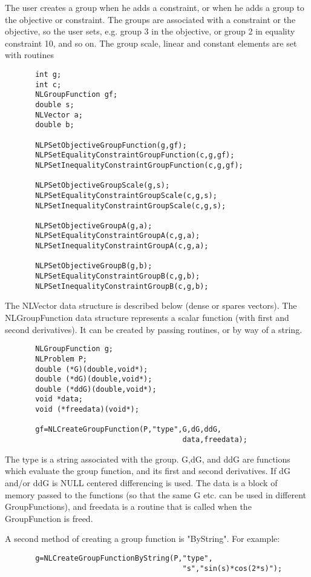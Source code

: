 \documentclass[12pt]{article}
\begin{document}
     The user creates a group when he adds a constraint, or when he adds a group to the objective or constraint.
     The groups are associated with a constraint or the objective, so the user sets, e.g. group 3 in the objective,
     or group 2 in equality constraint 10, and so on. The group scale, linear and constant elements are set with routines 
     \begin{verbatim}
       int g;
       int c;
       NLGroupFunction gf;
       double s;
       NLVector a;
       double b;

       NLPSetObjectiveGroupFunction(g,gf);
       NLPSetEqualityConstraintGroupFunction(c,g,gf);
       NLPSetInequalityConstraintGroupFunction(c,g,gf);

       NLPSetObjectiveGroupScale(g,s);
       NLPSetEqualityConstraintGroupScale(c,g,s);
       NLPSetInequalityConstraintGroupScale(c,g,s);

       NLPSetObjectiveGroupA(g,a);
       NLPSetEqualityConstraintGroupA(c,g,a);
       NLPSetInequalityConstraintGroupA(c,g,a);

       NLPSetObjectiveGroupB(g,b);
       NLPSetEqualityConstraintGroupB(c,g,b);
       NLPSetInequalityConstraintGroupB(c,g,b);
     \end{verbatim}
     The NLVector data structure is described below (dense or spares vectors). The NLGroupFunction data structure
     represents a scalar function (with first and second derivatives). It can be created by passing routines, or
     by way of a string.
     \begin{verbatim}
       NLGroupFunction g;
       NLProblem P;
       double (*G)(double,void*);
       double (*dG)(double,void*);
       double (*ddG)(double,void*);
       void *data;
       void (*freedata)(void*);

       gf=NLCreateGroupFunction(P,"type",G,dG,ddG,
                                         data,freedata);
     \end{verbatim}
      The type is a string associated with the group. G,dG, and ddG are functions which evaluate the group function,
      and its first and second derivatives. If dG and/or ddG is NULL centered differencing is used. The data is a
      block of memory passed to the functions (so that the same G etc. can be used in different GroupFunctions), and
      freedata is a routine that is called when the GroupFunction is freed.

      A second method of creating a group function is "ByString". For example:
     \begin{verbatim}
       g=NLCreateGroupFunctionByString(P,"type",
                                         "s","sin(s)*cos(2*s)");
     \end{verbatim}
\end{document}
